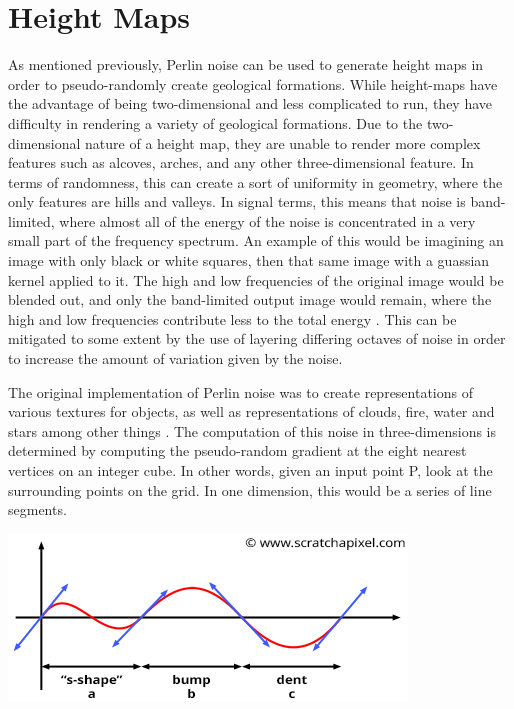 \documentclass[10pt]{report}
\begin{document}
	\vspace{10pt}
	\let\clearpage\relax
	\chapter{Height Maps}
	
		As mentioned previously, Perlin noise can be used to generate height maps in order to pseudo-randomly create geological formations. While height-maps have the advantage of being two-dimensional and less complicated to run, they have difficulty in rendering a variety of geological formations. Due to the two-dimensional nature of a height map, they are unable to render more complex features such as alcoves, arches, and any other three-dimensional feature. In terms of randomness, this can create a sort of uniformity in geometry, where the only features are hills and valleys. In signal terms, this means that noise is band-limited, where almost all of the energy of the noise is concentrated in a very small part of the frequency spectrum. An example of this would be imagining an image with only black or white squares, then that same image with a guassian kernel applied to it. The high and low frequencies of the original image would be blended out, and only the band-limited output image would remain, where the high and low frequencies contribute less to the total energy \cite{making-noise}. This can be mitigated to some extent by the use of layering differing octaves of noise in order to increase the amount of variation given by the noise. 
		
		The original implementation of Perlin noise was to create representations of various textures for objects, as well as representations of clouds, fire, water and stars among other things \cite{10.1145/325165.325247}. The computation of this noise in three-dimensions is determined by computing the pseudo-random gradient at the eight nearest vertices on an integer cube. In other words, given an input point P, look at the surrounding points on the grid. In one dimension, this would be a series of line segments. 
		
		\begin{minipage}{\textwidth}
			\centering
			\includegraphics[scale=.5]{noise-value-vs-perlin3}
			\label{fig:fig5}
		\end{minipage} 
		
\end{document}
